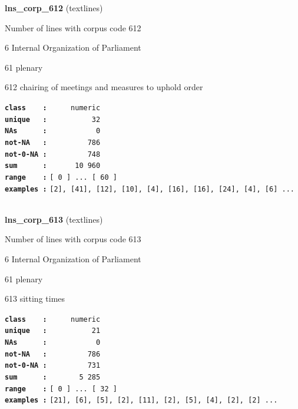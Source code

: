 \documentclass[]{article}
\begin{document}
\textbf{lns\_corp\_612} (textlines)

Number of lines with corpus code 612

6 Internal Organization of Parliament

61 plenary

612 chairing of meetings and measures to uphold order

\textbf{\texttt{class\ \ \ \ :}} \texttt{~~~~~numeric}\\
\textbf{\texttt{unique\ \ \ :}} \texttt{~~~~~~~~~~32}\\
\textbf{\texttt{NAs\ \ \ \ \ \ :}} \texttt{~~~~~~~~~~~0}\\
\textbf{\texttt{not-NA\ \ \ :}} \texttt{~~~~~~~~~786}\\
\textbf{\texttt{not-0-NA\ :}} \texttt{~~~~~~~~~748}\\
\textbf{\texttt{sum\ \ \ \ \ \ :}} \texttt{~~~~~~10~960}\\
\textbf{\texttt{range\ \ \ \ :}}
\texttt{{[}\ 0\ {]}\ ...\ {[}\ 60\ {]}}\\
\textbf{\texttt{examples\ :}}
\texttt{{[}2{]},\ {[}41{]},\ {[}12{]},\ {[}10{]},\ {[}4{]},\ {[}16{]},\ {[}16{]},\ {[}24{]},\ {[}4{]},\ {[}6{]}\ ...}\\

~

\textbf{lns\_corp\_613} (textlines)

Number of lines with corpus code 613

6 Internal Organization of Parliament

61 plenary

613 sitting times

\textbf{\texttt{class\ \ \ \ :}} \texttt{~~~~~numeric}\\
\textbf{\texttt{unique\ \ \ :}} \texttt{~~~~~~~~~~21}\\
\textbf{\texttt{NAs\ \ \ \ \ \ :}} \texttt{~~~~~~~~~~~0}\\
\textbf{\texttt{not-NA\ \ \ :}} \texttt{~~~~~~~~~786}\\
\textbf{\texttt{not-0-NA\ :}} \texttt{~~~~~~~~~731}\\
\textbf{\texttt{sum\ \ \ \ \ \ :}} \texttt{~~~~~~~5~285}\\
\textbf{\texttt{range\ \ \ \ :}}
\texttt{{[}\ 0\ {]}\ ...\ {[}\ 32\ {]}}\\
\textbf{\texttt{examples\ :}}
\texttt{{[}21{]},\ {[}6{]},\ {[}5{]},\ {[}2{]},\ {[}11{]},\ {[}2{]},\ {[}5{]},\ {[}4{]},\ {[}2{]},\ {[}2{]}\ ...}\\
\end{document}
